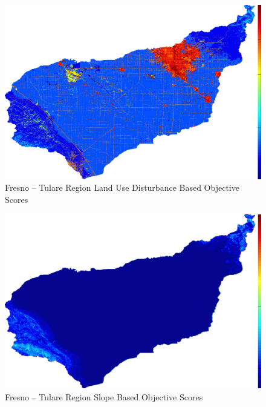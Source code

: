         \begin{figure}[!h]
            \begin{center}
            \includegraphics[width=5.5in]{figures/Fresno_DisturbanceScore.png}   
            \caption{Fresno -- Tulare Region Land Use Disturbance Based Objective Scores}
            \label{fig:Fdisturbance}
            \end{center}
        \end{figure}
        
        \begin{figure}[!h]
            \begin{center}
            \includegraphics[width=5.5in]{figures/Fresno_SlopeScore.png}   
            \caption{Fresno -- Tulare Region Slope Based Objective Scores}
            \label{fig:Fslope}
            \end{center}
        \end{figure}
        
